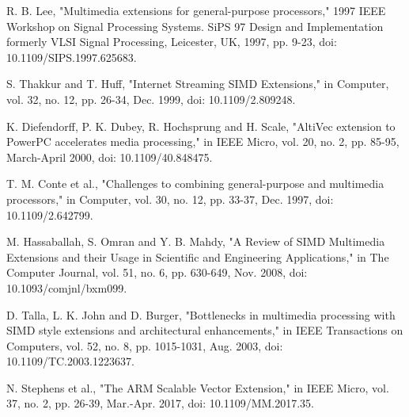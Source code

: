 \documentclass[conference]{IEEEtran}
\begin{document}
\begin{thebibliography}{00}
 R. B. Lee, "Multimedia extensions for general-purpose processors," 1997 IEEE Workshop on Signal Processing Systems. SiPS 97 Design and Implementation formerly VLSI Signal Processing, Leicester, UK, 1997, pp. 9-23, doi: 10.1109/SIPS.1997.625683.

 S. Thakkur and T. Huff, "Internet Streaming SIMD Extensions," in Computer, vol. 32, no. 12, pp. 26-34, Dec. 1999, doi: 10.1109/2.809248.

 K. Diefendorff, P. K. Dubey, R. Hochsprung and H. Scale, "AltiVec extension to PowerPC accelerates media processing," in IEEE Micro, vol. 20, no. 2, pp. 85-95, March-April 2000, doi: 10.1109/40.848475.

 T. M. Conte et al., "Challenges to combining general-purpose and multimedia processors," in Computer, vol. 30, no. 12, pp. 33-37, Dec. 1997, doi: 10.1109/2.642799.

 M. Hassaballah, S. Omran and Y. B. Mahdy, "A Review of SIMD Multimedia Extensions and their Usage in Scientific and Engineering Applications," in The Computer Journal, vol. 51, no. 6, pp. 630-649, Nov. 2008, doi: 10.1093/comjnl/bxm099.

 D. Talla, L. K. John and D. Burger, "Bottlenecks in multimedia processing with SIMD style extensions and architectural enhancements," in IEEE Transactions on Computers, vol. 52, no. 8, pp. 1015-1031, Aug. 2003, doi: 10.1109/TC.2003.1223637.

 N. Stephens et al., "The ARM Scalable Vector Extension," in IEEE Micro, vol. 37, no. 2, pp. 26-39, Mar.-Apr. 2017, doi: 10.1109/MM.2017.35.

\end{thebibliography}
\end{document}
